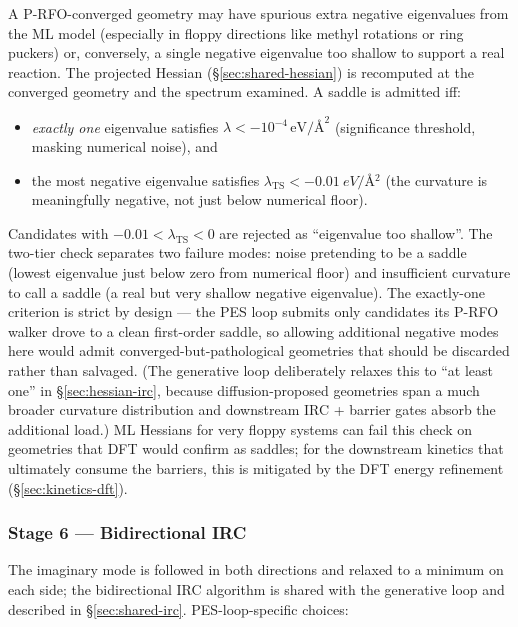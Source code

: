 A P-RFO-converged geometry may have spurious extra negative eigenvalues from the ML model (especially in floppy directions like methyl rotations or ring puckers) or, conversely, a single negative eigenvalue too shallow to support a real reaction. The projected Hessian (\S\ref{sec:shared-hessian}) is recomputed at the converged geometry and the spectrum examined. A saddle is admitted iff:
\begin{itemize}
    \item \emph{exactly one} eigenvalue satisfies $\lambda < -10^{-4}\,\text{eV/\AA}^2$ (significance threshold, masking numerical noise), and
    \item the most negative eigenvalue satisfies $\lambda_\text{TS} < \SI{-0.01}{eV/\angstrom^2}$ (the curvature is meaningfully negative, not just below numerical floor).
\end{itemize}
Candidates with $-0.01 < \lambda_\text{TS} < 0$ are rejected as ``eigenvalue too shallow''. The two-tier check separates two failure modes: noise pretending to be a saddle (lowest eigenvalue just below zero from numerical floor) and insufficient curvature to call a saddle (a real but very shallow negative eigenvalue). The exactly-one criterion is strict by design --- the PES loop submits only candidates its P-RFO walker drove to a clean first-order saddle, so allowing additional negative modes here would admit converged-but-pathological geometries that should be discarded rather than salvaged. (The generative loop deliberately relaxes this to ``at least one'' in \S\ref{sec:hessian-irc}, because diffusion-proposed geometries span a much broader curvature distribution and downstream IRC + barrier gates absorb the additional load.) ML Hessians for very floppy systems can fail this check on geometries that DFT would confirm as saddles; for the downstream kinetics that ultimately consume the barriers, this is mitigated by the DFT energy refinement (\S\ref{sec:kinetics-dft}).


\subsubsection{Stage 6 --- Bidirectional IRC}
\label{sec:pes-irc}

The imaginary mode is followed in both directions and relaxed to a minimum on each side; the bidirectional IRC algorithm is shared with the generative loop and described in \S\ref{sec:shared-irc}. PES-loop-specific choices:


